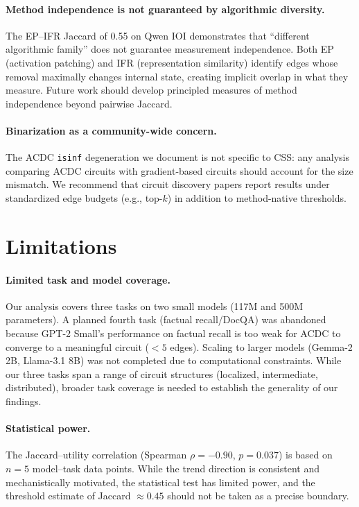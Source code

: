 \documentclass[11pt,a4paper]{article}
\newcommand{\css}{\textsc{CSS}}
\begin{document}
\paragraph{Method independence is not guaranteed by algorithmic diversity.}
The EP--IFR Jaccard of 0.55 on Qwen IOI demonstrates that ``different algorithmic family'' does not guarantee measurement independence.
Both EP (activation patching) and IFR (representation similarity) identify edges whose removal maximally changes internal state, creating implicit overlap in what they measure.
Future work should develop principled measures of method independence beyond pairwise Jaccard.

\paragraph{Binarization as a community-wide concern.}
The ACDC \texttt{isinf} degeneration we document is not specific to \css{}: any analysis comparing ACDC circuits with gradient-based circuits should account for the size mismatch.
We recommend that circuit discovery papers report results under standardized edge budgets (e.g., top-$k$) in addition to method-native thresholds.

\section{Limitations}
\label{sec:limitations}

\paragraph{Limited task and model coverage.}
Our analysis covers three tasks on two small models (117M and 500M parameters).
A planned fourth task (factual recall/DocQA) was abandoned because GPT-2 Small's performance on factual recall is too weak for ACDC to converge to a meaningful circuit ($<5$ edges).
Scaling to larger models (Gemma-2 2B, Llama-3.1 8B) was not completed due to computational constraints.
While our three tasks span a range of circuit structures (localized, intermediate, distributed), broader task coverage is needed to establish the generality of our findings.

\paragraph{Statistical power.}
The Jaccard--utility correlation (Spearman $\rho = -0.90$, $p = 0.037$) is based on $n = 5$ model--task data points.
While the trend direction is consistent and mechanistically motivated, the statistical test has limited power, and the threshold estimate of Jaccard $\approx 0.45$ should not be taken as a precise boundary.
\end{document}
